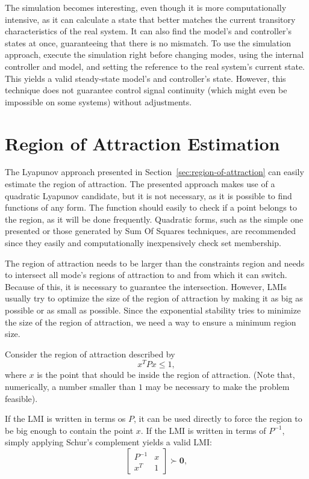 The simulation becomes interesting, even though it is more computationally
intensive, as it can calculate a state that better matches the current
transitory characteristics of the real system. It can also find the model's and
controller's states at once, guaranteeing that there is no mismatch. To use the
simulation approach, execute the simulation right before changing modes, using
the internal controller and model, and setting the reference to the real
system's current state. This yields a valid steady-state model's and
controller's state. However, this technique does not guarantee control signal
continuity (which might even be impossible on some systems) without adjustments.

\section{Region of Attraction Estimation}%
\label{sec:roa-estimation}

The Lyapunov approach presented in Section~\ref{sec:region-of-attraction} can
easily estimate the region of attraction. The presented approach makes use of a
quadratic Lyapunov candidate, but it is not necessary, as it is possible to find
functions of any form. The function should easily to check if a point belongs to
the region, as it will be done frequently. Quadratic forms, such as the simple
one presented or those generated by Sum Of Squares techniques, are recommended
since they easily and computationally inexpensively check set membership.

The region of attraction needs to be larger than the constraints region and
needs to intersect all mode's regions of attraction to and from which it can
switch. Because of this, it is necessary to guarantee the intersection. However,
LMIs usually try to optimize the size of the region of attraction by making it
as big as possible or as small as possible. Since the exponential stability
tries to minimize the size of the region of attraction, we need a way to ensure
a minimum region size.

Consider the region of attraction described by
%
\begin{equation}
	x^{T}Px \le{} 1,
\end{equation}
%
where \(x\) is the point that should be inside the region of attraction. (Note
that, numerically, a number smaller than \(1\) may be necessary to make the
problem feasible).

If the LMI is written in terms os \(P\), it can be used directly to force the
region to be big enough to contain the point \(x\). If the LMI is written in
terms of \(P^{-1}\), simply applying Schur's complement yields a valid LMI:
%
\begin{equation}
	\label{eq:lmi-point-inside-roa}
	\begin{bmatrix}
		P^{-1} & x \\
		x^{T}  & 1
	\end{bmatrix} \succ \mathbf{0},
\end{equation}

